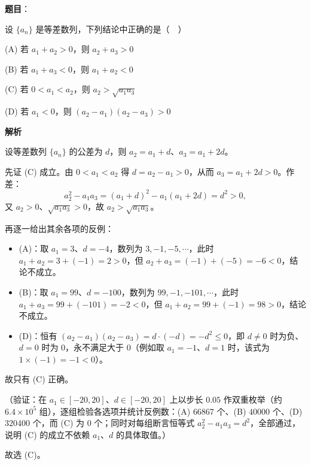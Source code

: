 \begin{answer}

\textbf{题目}：

设 \(\{a_{n}\}\) 是等差数列，下列结论中正确的是（　）

(A) 若 \(a_{1}+a_{2}>0\)，则 \(a_{2}+a_{3}>0\)

(B) 若 \(a_{1}+a_{3}<0\)，则 \(a_{1}+a_{2}<0\)

(C) 若 \(0<a_{1}<a_{2}\)，则 \(a_{2}>\sqrt{a_{1}a_{3}}\)

(D) 若 \(a_{1}<0\)，则 \((a_{2}-a_{1})(a_{2}-a_{3})>0\)

\textbf{解析}

设等差数列 \(\{a_{n}\}\) 的公差为 \(d\)，则 \(a_{2}=a_{1}+d\)、\(a_{3}=a_{1}+2d\)。

先证 (C) 成立。由 \(0<a_{1}<a_{2}\) 得 \(d=a_{2}-a_{1}>0\)，从而 \(a_{3}=a_{1}+2d>0\)。作差：
\nopagebreak[4]
\[
a_{2}^{2}-a_{1}a_{3}=(a_{1}+d)^{2}-a_{1}(a_{1}+2d)=d^{2}>0,
\]
又 \(a_{2}>0\)、\(\sqrt{a_{1}a_{3}}>0\)，故 \(a_{2}>\sqrt{a_{1}a_{3}}\)。

再逐一给出其余各项的反例：

\begin{itemize}
\item (A)：取 \(a_{1}=3\)、\(d=-4\)，数列为 \(3,-1,-5,\cdots\)，此时 \(a_{1}+a_{2}=3+(-1)=2>0\)，但 \(a_{2}+a_{3}=(-1)+(-5)=-6<0\)，结论不成立。
\item (B)：取 \(a_{1}=99\)、\(d=-100\)，数列为 \(99,-1,-101,\cdots\)，此时 \(a_{1}+a_{3}=99+(-101)=-2<0\)，但 \(a_{1}+a_{2}=99+(-1)=98>0\)，结论不成立。
\item (D)：恒有 \((a_{2}-a_{1})(a_{2}-a_{3})=d\cdot(-d)=-d^{2}\leqslant0\)，即 \(d\neq0\) 时为负、\(d=0\) 时为 \(0\)，永不满足大于 \(0\)（例如取 \(a_{1}=-1\)、\(d=1\) 时，该式为 \(1\times(-1)=-1<0\)）。
\end{itemize}

故只有 (C) 正确。

（验证：在 \(a_{1}\in[-20,20]\)、\(d\in[-20,20]\) 上以步长 \(0.05\) 作双重枚举（约 \(6.4\times10^{5}\) 组），逐组检验各选项并统计反例数：(A) \(66867\) 个、(B) \(40000\) 个、(D) \(320400\) 个，而 (C) 为 \(0\) 个；同时对每组断言恒等式 \(a_{2}^{2}-a_{1}a_{3}=d^{2}\)，全部通过，说明 (C) 的成立不依赖 \(a_{1}\)、\(d\) 的具体取值。）

故选 (C)。


\end{answer}
